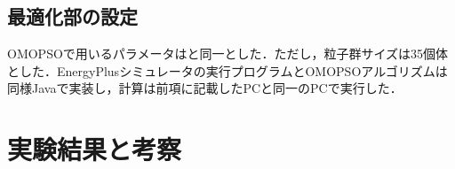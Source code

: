 \subsection{最適化部の設定}\label{subsec::surrogate_setting_omopso}
OMOPSOで用いるパラメータはと同一とした．ただし，粒子群サイズは35個体とした．EnergyPlusシミュレータの実行プログラムとOMOPSOアルゴリズムは同様Javaで実装し，計算は前項に記載したPCと同一のPCで実行した．

\section{実験結果と考察}\label{sec::surrogate_result}


